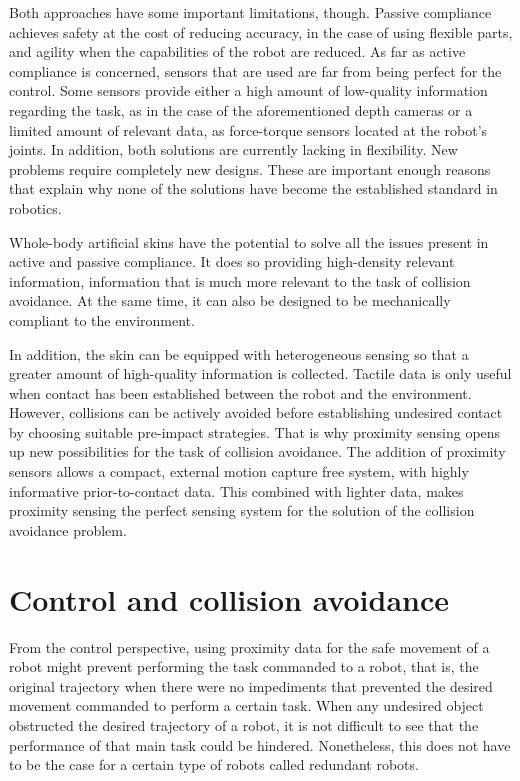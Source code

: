 Both approaches have some important limitations, though. Passive compliance achieves safety at the cost of reducing accuracy, in the case of using flexible parts, and agility when the capabilities of the robot are reduced. As far as active compliance is concerned, sensors that are used are far from being perfect for the control. Some sensors provide either a high amount of low-quality information regarding the task, as in the case of the aforementioned depth cameras or a limited amount of relevant data, as force-torque sensors located at the robot’s joints. In addition, both solutions are currently lacking in flexibility. New problems require completely new designs. These are important enough reasons that explain why none of the solutions have become the established standard in robotics.

Whole-body artificial skins have the potential to solve all the issues present in active and passive compliance. It does so providing high-density relevant information, information that is much more relevant to the task of collision avoidance. At the same time, it can also be designed to be mechanically compliant to the environment.


In addition, the skin can be equipped with heterogeneous sensing so that a greater amount of high-quality information is collected. Tactile data is only useful when contact has been established between the robot and the environment. However, collisions can be actively avoided before establishing undesired contact by choosing suitable pre-impact strategies. That is why proximity sensing opens up new possibilities for the task of collision avoidance. The addition of proximity sensors allows a compact, external motion capture free system, with highly informative prior-to-contact data. This combined with lighter data, makes proximity sensing the perfect sensing system for the solution of the collision avoidance problem.

\section{Control and collision avoidance}
From the control perspective, using proximity data for the safe movement of a robot might prevent performing the task commanded to a robot, that is, the original trajectory when there were no impediments that prevented the desired movement commanded to perform a certain task. When any undesired object obstructed the desired trajectory of a robot, it is not difficult to see that the performance of that main task could be hindered. Nonetheless, this does not have to be the case for a certain type of robots called redundant robots.

